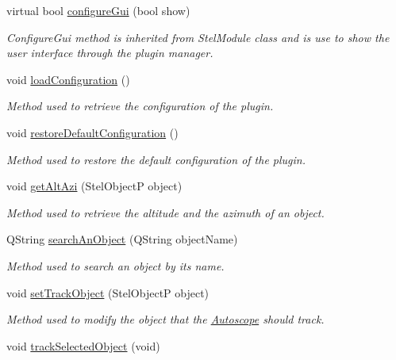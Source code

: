 \begin{DoxyCompactItemize}
virtual bool \mbox{\hyperlink{class_autoscope_a1a3fca34a12ae80391943194340d2c7e}{configure\+Gui}} (bool show)
\begin{DoxyCompactList}\small\item\em Configure\+Gui method is inherited from Stel\+Module class and is use to show the user interface through the plugin manager. \end{DoxyCompactList}\item 
void \mbox{\hyperlink{class_autoscope_af24c123f39ace0191799b5c20ceca7a6}{load\+Configuration}} ()
\begin{DoxyCompactList}\small\item\em Method used to retrieve the configuration of the plugin. \end{DoxyCompactList}\item 
void \mbox{\hyperlink{class_autoscope_a2c5424afe3270c6069e0109834dd52b5}{restore\+Default\+Configuration}} ()
\begin{DoxyCompactList}\small\item\em Method used to restore the default configuration of the plugin. \end{DoxyCompactList}\item 
void \mbox{\hyperlink{class_autoscope_af61a84b86f02cc55472c53cc79b025b2}{get\+Alt\+Azi}} (Stel\+ObjectP object)
\begin{DoxyCompactList}\small\item\em Method used to retrieve the altitude and the azimuth of an object. \end{DoxyCompactList}\item 
Q\+String \mbox{\hyperlink{class_autoscope_af1d803331f5ab5f5ff5d3839df8952c7}{search\+An\+Object}} (Q\+String object\+Name)
\begin{DoxyCompactList}\small\item\em Method used to search an object by it\textquotesingle{}s name. \end{DoxyCompactList}\item 
void \mbox{\hyperlink{class_autoscope_a0a616d2998641471cb6785e2abb6e7b5}{set\+Track\+Object}} (Stel\+ObjectP object)
\begin{DoxyCompactList}\small\item\em Method used to modify the object that the \mbox{\hyperlink{class_autoscope}{Autoscope}} should track. \end{DoxyCompactList}\item 
void \mbox{\hyperlink{class_autoscope_a5782dc8cf3afeb9710240fdc98d0caa1}{track\+Selected\+Object}} (void)

\end{DoxyCompactItemize}
